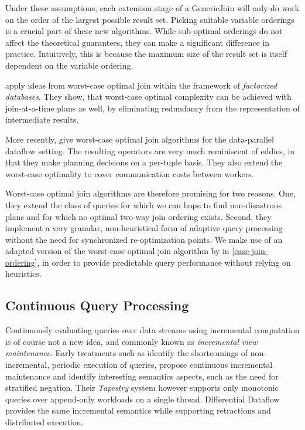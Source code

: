 \documentclass[../index.tex]{subfiles}
\begin{document}
Under these assumptions, each extension stage of a GenericJoin will
only do work on the order of the largest possible result set. Picking
suitable variable orderings is a crucial part of these new
algorithms. While sub-optimal orderings do not affect the theoretical
guarantees, they can make a significant difference in
practice. Intuitively, this is because the maximum size of the result
set is itself dependent on the variable ordering.

\cite{ciucanu2015worst} apply ideas from worst-case optimal join
within the framework of \emph{factorized databases}. They show, that
worst-case optimal complexity can be achieved with join-at-a-time
plans as well, by eliminating redundancy from the representation of
intermediate results.

More recently, \cite{ammar2018distributed} give worst-case optimal
join algorithms for the data-parallel dataflow setting. The resulting
operators are very much reminiscent of eddies, in that they make
planning decisions on a per-tuple basis. They also extend the
worst-case optimality to cover communication costs between workers.

Worst-case optimal join algorithms are therefore promising for two
reasons. One, they extend the class of queries for which we can hope
to find non-disastrous plans and for which no optimal two-way join
ordering exists. Second, they implement a very granular,
non-heuristical form of adaptive query processing without the need for
synchronized re-optimization points. We make use of an adapted version
of the worst-case optimal join algorithm by
\cite{ammar2018distributed} in \autoref{case-join-ordering}, in order
to provide predictable query performance without relying on
heuristics.

\subsection{Continuous Query Processing}

Continuously evaluating queries over data streams using incremental
computation is of course not a new idea, and commonly known as
\emph{incremental view maintenance}. Early treatments such as
\cite{terry1992continuous} identify the shortcomings of
non-incremental, periodic execution of queries, propose continuous
incremental maintenance and identify interesting semantics aspects,
such as the need for stratified negation. Their \emph{Tapestry} system
however supports only monotonic queries over append-only workloads on
a single thread. Differential Dataflow provides the same incremental
semantics while supporting retractions and distributed execution.
\end{document}
